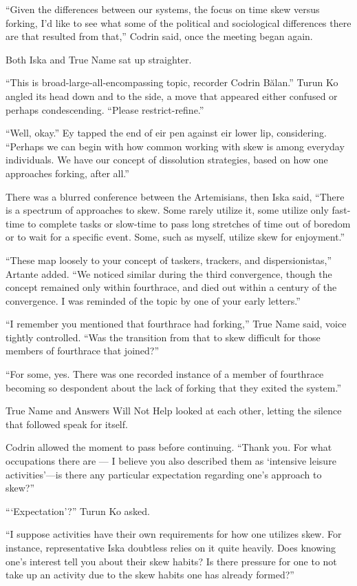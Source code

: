 ``Given the differences between our systems, the focus on time skew versus forking, I'd like to see what some of the political and sociological differences there are that resulted from that,'' Codrin said, once the meeting began again.

Both Iska and True Name sat up straighter.

``This is broad-large-all-encompassing topic, recorder Codrin Bălan.'' Turun Ko angled its head down and to the side, a move that appeared either confused or perhaps condescending. ``Please restrict-refine.''

``Well, okay.'' Ey tapped the end of eir pen against eir lower lip, considering. ``Perhaps we can begin with how common working with skew is among everyday individuals. We have our concept of dissolution strategies, based on how one approaches forking, after all.''

There was a blurred conference between the Artemisians, then Iska said, ``There is a spectrum of approaches to skew. Some rarely utilize it, some utilize only fast-time to complete tasks or slow-time to pass long stretches of time out of boredom or to wait for a specific event. Some, such as myself, utilize skew for enjoyment.''

``These map loosely to your concept of taskers, trackers, and dispersionistas,'' Artante added. ``We noticed similar during the third convergence, though the concept remained only within fourthrace, and died out within a century of the convergence. I was reminded of the topic by one of your early letters.''

``I remember you mentioned that fourthrace had forking,'' True Name said, voice tightly controlled. ``Was the transition from that to skew difficult for those members of fourthrace that joined?''

``For some, yes. There was one recorded instance of a member of fourthrace becoming so despondent about the lack of forking that they exited the system.''

True Name and Answers Will Not Help looked at each other, letting the silence that followed speak for itself.

Codrin allowed the moment to pass before continuing. ``Thank you. For what occupations there are — I believe you also described them as `intensive leisure activities'—is there any particular expectation regarding one's approach to skew?''

```Expectation'?'' Turun Ko asked.

``I suppose activities have their own requirements for how one utilizes skew. For instance, representative Iska doubtless relies on it quite heavily. Does knowing one's interest tell you about their skew habits? Is there pressure for one to not take up an activity due to the skew habits one has already formed?''

